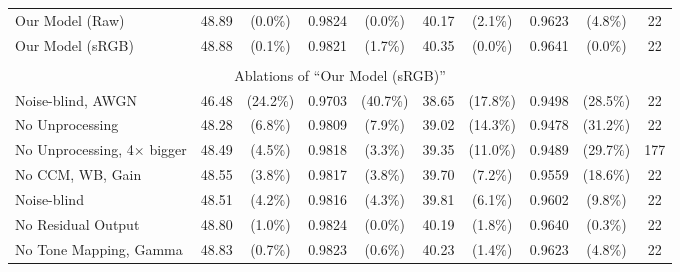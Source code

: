 \documentclass[10pt,twocolumn,letterpaper]{article}
\begin{document}
\begin{table*}[]
\begin{center}
{\begin{tabular}{ l || cc|cc || cc|cc || c }
Our Model (Raw)     &  \cellcolor{Red} 48.89 & \cellcolor{Red} (0.0\%) & \cellcolor{Red} 0.9824 & \cellcolor{Red} (0.0\%) & \cellcolor{Orange} 40.17 & \cellcolor{Orange} (2.1\%) & \cellcolor{Orange} 0.9623 & \cellcolor{Orange} (4.8\%) & 22 \\
Our Model (sRGB)    &  \cellcolor{Orange} 48.88 & \cellcolor{Orange} (0.1\%) & \cellcolor{Orange} 0.9821 & \cellcolor{Orange} (1.7\%) & \cellcolor{Red} 40.35 & \cellcolor{Red} (0.0\%) & \cellcolor{Red} 0.9641 & \cellcolor{Red} (0.0\%) & 22 \\


%
 \multicolumn{10}{c}{} \\
\multicolumn{10}{c}{Ablations of ``Our Model (sRGB)''} \\
\hline


Noise-blind, AWGN  &   46.48 &  (24.2\%) &  0.9703 &  (40.7\%) &  38.65 &  (17.8\%) &  0.9498 &  (28.5\%) & 22\\
No Unprocessing  &   48.28 &  (6.8\%) &  0.9809 &  (7.9\%) &  39.02 &  (14.3\%) &  0.9478 &  (31.2\%) & 22\\
No Unprocessing, 4$\times$ bigger &  48.49 &  (4.5\%) &  0.9818 &  (3.3\%) &  39.35 &  (11.0\%) &  0.9489 &  (29.7\%) & 177 \\
No CCM, WB, Gain  &   48.55 &  (3.8\%) &  0.9817 &  (3.8\%) &  39.70 &  (7.2\%) &  0.9559 &  (18.6\%) & 22\\
Noise-blind  &   48.51 &  (4.2\%) &  0.9816 &  (4.3\%) &  39.81 &  (6.1\%) &  0.9602 &  (9.8\%) & 22\\
No Residual Output  &   48.80 &  (1.0\%) &  0.9824 &  (0.0\%) &  40.19 &  (1.8\%) &  0.9640 &  (0.3\%) & 22\\
No Tone Mapping, Gamma &   48.83 &  (0.7\%) &  0.9823 &  (0.6\%) &  40.23 &  (1.4\%) &  0.9623 &  (4.8\%) & 22\\



\end{tabular}}
\end{center}
\end{table*}
\end{document}
